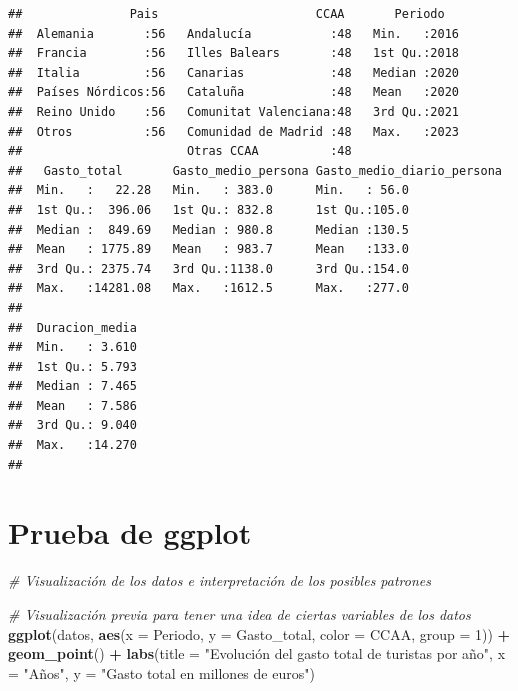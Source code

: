 \documentclass[notspecified,article,submit,moreauthors,pdftex]{Definitions/mdpi}
\newenvironment{Shaded}{\begin{snugshade}}{\end{snugshade}}
\newcommand{\AttributeTok}[1]{\textcolor[rgb]{0.13,0.29,0.53}{#1}}
\newcommand{\CommentTok}[1]{\textcolor[rgb]{0.56,0.35,0.01}{\textit{#1}}}
\newcommand{\DecValTok}[1]{\textcolor[rgb]{0.00,0.00,0.81}{#1}}
\newcommand{\FunctionTok}[1]{\textcolor[rgb]{0.13,0.29,0.53}{\textbf{#1}}}
\newcommand{\NormalTok}[1]{#1}
\newcommand{\SpecialCharTok}[1]{\textcolor[rgb]{0.81,0.36,0.00}{\textbf{#1}}}
\newcommand{\StringTok}[1]{\textcolor[rgb]{0.31,0.60,0.02}{#1}}
\begin{document}
\begin{verbatim}
##               Pais                      CCAA       Periodo    
##  Alemania       :56   Andalucía           :48   Min.   :2016  
##  Francia        :56   Illes Balears       :48   1st Qu.:2018  
##  Italia         :56   Canarias            :48   Median :2020  
##  Países Nórdicos:56   Cataluña            :48   Mean   :2020  
##  Reino Unido    :56   Comunitat Valenciana:48   3rd Qu.:2021  
##  Otros          :56   Comunidad de Madrid :48   Max.   :2023  
##                       Otras CCAA          :48                 
##   Gasto_total       Gasto_medio_persona Gasto_medio_diario_persona
##  Min.   :   22.28   Min.   : 383.0      Min.   : 56.0             
##  1st Qu.:  396.06   1st Qu.: 832.8      1st Qu.:105.0             
##  Median :  849.69   Median : 980.8      Median :130.5             
##  Mean   : 1775.89   Mean   : 983.7      Mean   :133.0             
##  3rd Qu.: 2375.74   3rd Qu.:1138.0      3rd Qu.:154.0             
##  Max.   :14281.08   Max.   :1612.5      Max.   :277.0             
##                                                                   
##  Duracion_media  
##  Min.   : 3.610  
##  1st Qu.: 5.793  
##  Median : 7.465  
##  Mean   : 7.586  
##  3rd Qu.: 9.040  
##  Max.   :14.270  
## 
\end{verbatim}

\section{Prueba de ggplot}\label{prueba-de-ggplot}

\begin{Shaded}
\begin{Highlighting}[]
\CommentTok{\# Visualización de los datos e interpretación de los posibles patrones}

\CommentTok{\# Visualización previa para tener una idea de ciertas variables de los datos}
\FunctionTok{ggplot}\NormalTok{(datos, }\FunctionTok{aes}\NormalTok{(}\AttributeTok{x =}\NormalTok{ Periodo, }\AttributeTok{y =}\NormalTok{ Gasto\_total, }\AttributeTok{color =}\NormalTok{ CCAA, }\AttributeTok{group =} \DecValTok{1}\NormalTok{)) }\SpecialCharTok{+}
  \FunctionTok{geom\_point}\NormalTok{() }\SpecialCharTok{+}
  \FunctionTok{labs}\NormalTok{(}\AttributeTok{title =} \StringTok{"Evolución del gasto total de turistas por año"}\NormalTok{, }\AttributeTok{x  =} \StringTok{"Años"}\NormalTok{, }\AttributeTok{y =} \StringTok{"Gasto total en millones de euros"}\NormalTok{)}
\end{Highlighting}
\end{Shaded}
\end{document}
